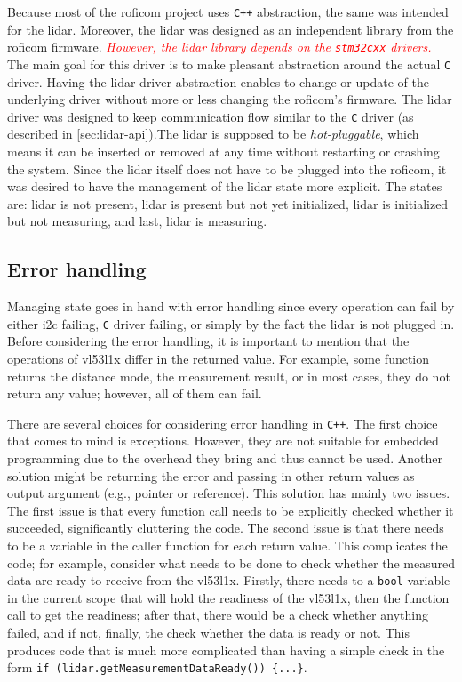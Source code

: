 \documentclass[
  digital,     %
  oneside,     %
  nosansbold,  %
  nocolorbold, %
  nolof,         %
  nolot,         %
]{fithesis4}
\newcommand{\TODO}[1]{\textcolor{red}{\textit{#1}}}
\begin{document}
{{{Because most of the \acrshort{roficom} project uses \verb|C++| abstraction, the same was intended for the \acrshort{lidar}. Moreover, the \acrshort{lidar} was designed as an independent library from the \acrshort{roficom} firmware. \TODO{However, the \acrshort{lidar} library depends on the \texttt{stm32cxx} drivers.} The main goal for this driver is to make pleasant abstraction around the actual \verb|C| driver. Having the \acrshort{lidar} driver abstraction enables to change or update of the underlying driver without more or less changing the \acrshort{roficom}'s firmware. The \acrshort{lidar} driver was designed to keep communication flow similar to the \verb|C| driver (as described in \autoref{sec:lidar-api}).The \acrshort{lidar} is supposed to be \emph{hot-pluggable}, which means it can be inserted or removed at any time without restarting or crashing the system. Since the \acrshort{lidar} itself does not have to be plugged into the \acrshort{roficom}, it was desired to have the management of the \acrshort{lidar} state more explicit. The states are: \acrshort{lidar} is not present, \acrshort{lidar} is present but not yet initialized, \acrshort{lidar} is initialized but not measuring, and last, \acrshort{lidar} is measuring. 

\subsection{Error handling}
Managing state goes in hand with error handling since every operation can fail by either \acrshort{i2c} failing, \verb|C| driver failing, or simply by the fact the \acrshort{lidar} is not plugged in. Before considering the error handling, it is important to mention that the operations of \gls{vl53l1x} differ in the returned value. For example, some function returns the distance mode, the measurement result, or in most cases, they do not return any value; however, all of them can fail.

There are several choices for considering error handling in \verb|C++|. The first choice that comes to mind is exceptions. However, they are not suitable for embedded programming due to the overhead they bring and thus cannot be used. Another solution might be returning the error and passing in other return values as output argument (e.g., pointer or reference). This solution has mainly two issues. The first issue is that every function call needs to be explicitly checked whether it succeeded, significantly cluttering the code. The second issue is that there needs to be a variable in the caller function for each return value. This complicates the code; for example, consider what needs to be done to check whether the measured data are ready to receive from the \gls{vl53l1x}. Firstly, there needs to a \lstinline|bool| variable in the current scope that will hold the readiness of the \gls{vl53l1x}, then the function call to get the readiness; after that, there would be a check whether anything failed, and if not, finally, the check whether the data is ready or not. This produces code that is much more complicated than having a simple check in the form \lstinline[breaklines=false]|if (lidar.getMeasurementDataReady()) {...}|.

}}}
\end{document}
